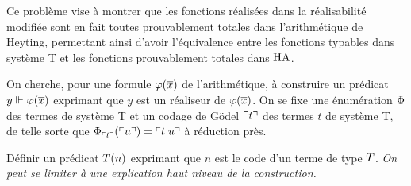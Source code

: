 \begin{problem}
  Ce problème vise à montrer que les fonctions réalisées dans la réalisabilité
  modifiée sont en fait toutes prouvablement totales dans l'arithmétique de
  Heyting, permettant ainsi d'avoir l'équivalence entre les fonctions typables
  dans système T et les fonctions prouvablement totales dans $\operatorname{HA}$.


  On cherche, pour une formule $\varphi(\overline{x})$ de l'arithmétique, à construire
  un prédicat $y \Vdash\varphi(\overline{x})$ exprimant que $y$ est un réaliseur de
  $\varphi(\overline{x})$. On se fixe une énumération $\operatorname{\Phi}$ des termes de système T
  et un codage de Gödel $\ulcorner t\urcorner$ des termes $t$ de système T, de telle sorte
  que $\operatorname{\Phi}_{\ulcorner t\urcorner}^{}(\ulcorner u\urcorner) = \ulcorner t\;u\urcorner$ à réduction près.
  \begin{pbQuest}
  \item Définir un prédicat $T(n)$ exprimant que $n$ est le code
    d'un terme de type $T$. \textit{On peut se limiter à une explication
      haut niveau de la construction.}
  \end{pbQuest}


\end{problem}
